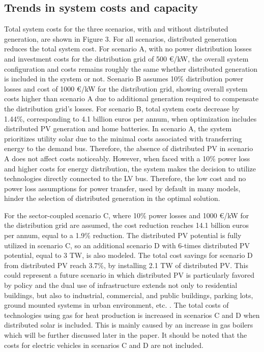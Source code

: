 \documentclass[review]{elsarticle}
\begin{document}
	\subsection{Trends in system costs and capacity}
	
	Total system costs for the three scenarios, with and without distributed generation, are shown in Figure 3. For all scenarios, distributed generation reduces the total system cost. For scenario A, with no power distribution losses and investment costs for the distribution grid of 500 €/kW, the overall system configuration and costs remains roughly the same whether distributed generation is included in the system or not. Scenario B assumes 10\% distribution power losses and cost of 1000 €/kW for the distribution grid, showing overall system costs higher than scenario A due to additional generation required to compensate the distribution grid's losses. For scenario B, total system costs decrease by 1.44\%, corresponding to 4.1 billion euros per annum, when optimization includes distributed PV generation and home batteries. In scenario A, the system prioritizes utility solar due to the minimal costs associated with transferring energy to the demand bus. Therefore, the absence of distributed PV in scenario A does not affect costs noticeably. However, when faced with a 10\% power loss and higher costs for energy distribution, the system makes the decision to utilize technologies directly connected to the LV bus. Therefore, the low cost and no power loss assumptions for power transfer, used by default in many models, hinder the selection of distributed generation in the optimal solution.
	
	For the sector-coupled scenario C, where 10\% power losses and 1000 €/kW for the distribution grid are assumed, the cost reduction reaches 14.1 billion euros per annum, equal to a 1.9\% reduction. The distributed PV potential is fully utilized in scenario C, so an additional scenario D with 6-times distributed PV potential, equal to 3 TW, is also modeled. The total cost savings for scenario D from distributed PV reach 3.7\%, by installing 2.1 TW of distributed PV. This could represent a future scenario in which distributed PV is particularly favored by policy and the dual use of infrastructure extends not only to residential buildings, but also to industrial, commercial, and public buildings, parking lots, ground mounted systems in urban environment, etc. \cite{trondle_2019, France_senate2022}. The total costs of technologies using gas for heat production is increased in scenarios C and D when distributed solar is included. This is mainly caused by an increase in gas boilers which will be further discussed later in the paper. It should be noted that the costs for electric vehicles in scenarios C and D are not included.
	
\end{document}
